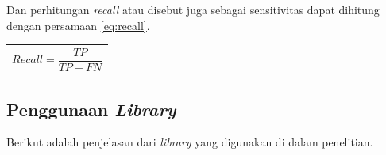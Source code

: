 Dan perhitungan \textit{recall} atau disebut juga sebagai sensitivitas dapat dihitung dengan persamaan \ref{eq:recall}.
\begin{table}[H]
	\begin{adjustbox}{width=1\textwidth}
	\begin{tabular}{|p{13.55cm}|}
		\hline
		\begin{equation}
			Recall = \frac{TP}{TP + FN}
			\label{eq:recall}
		\end{equation}\\
	\hline
	\end{tabular}
	\end{adjustbox}
\end{table}

\subsection{Penggunaan \textit{Library}}
\noindent Berikut adalah penjelasan dari \textit{library} yang digunakan di dalam penelitian. \\
